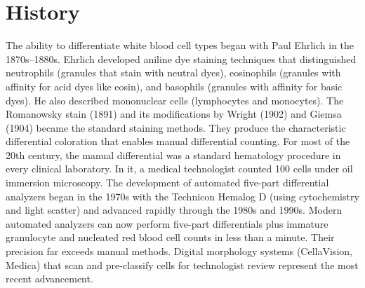\section*{History}
The ability to differentiate white blood cell types began with Paul Ehrlich in the 1870s--1880s. Ehrlich developed aniline dye staining techniques that distinguished neutrophils (granules that stain with neutral dyes), eosinophils (granules with affinity for acid dyes like eosin), and basophils (granules with affinity for basic dyes). He also described mononuclear cells (lymphocytes and monocytes). The Romanowsky stain (1891) and its modifications by Wright (1902) and Giemsa (1904) became the standard staining methods. They produce the characteristic differential coloration that enables manual differential counting. For most of the 20th century, the manual differential was a standard hematology procedure in every clinical laboratory. In it, a medical technologist counted 100 cells under oil immersion microscopy. The development of automated five-part differential analyzers began in the 1970s with the Technicon Hemalog D (using cytochemistry and light scatter) and advanced rapidly through the 1980s and 1990s. Modern automated analyzers can now perform five-part differentials plus immature granulocyte and nucleated red blood cell counts in less than a minute. Their precision far exceeds manual methods. Digital morphology systems (CellaVision, Medica) that scan and pre-classify cells for technologist review represent the most recent advancement.

